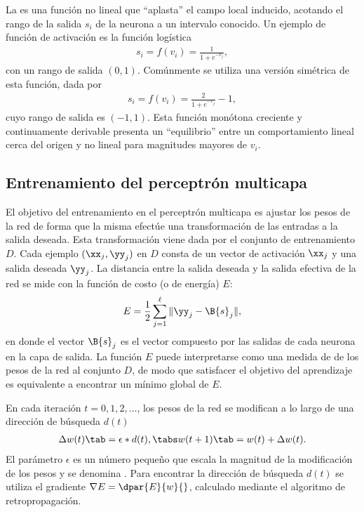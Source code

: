 La  es una función no lineal que ``aplasta''
el campo local inducido, acotando el rango de la salida $s_i$ de la
neurona a un intervalo conocido.  Un ejemplo de función de activación
es la función logística
%
\begin{align}
  s_i=f(v_i)=\frac{1}{1+e^{-v_j}},
\end{align}
%
con un rango de salida $(0,1)$. Comúnmente se utiliza una versión
simétrica de esta función, dada por
%
\begin{align}
  s_i=f(v_i) = \frac{2}{1+e^{-v_j}}-1,
\end{align}
%
cuyo rango de salida es $(-1,1)$. Esta función monótona creciente y
continuamente derivable presenta un ``equilibrio'' entre un
comportamiento lineal cerca del origen y no lineal para magnitudes
mayores de $v_i$.
%
%
\subsection{Entrenamiento del perceptrón multicapa}
%
El objetivo del entrenamiento en el perceptrón multicapa es ajustar
los pesos de la red de forma que la misma efectúe una transformación
de las entradas a la salida deseada. Esta transformación viene dada
por el conjunto de entrenamiento $D$.
Cada ejemplo $(\xx_j,\yy_j)$ en $D$ consta de un vector de activación
$\xx_j$ y una salida deseada $\yy_j$.
La distancia entre la salida deseada y la salida
efectiva de la red se mide con la función de costo (o de energía) $E$:
%
\begin{align}
  E = \frac{1}{2}\sum_{j=1}^{\ell}\|\yy_j-\B{s}_j\|,
\end{align}
%
en donde el vector $\B{s}_j$ es el vector compuesto por las salidas de
cada neurona en la capa de salida. La función $E$ puede
interpretarse como una medida de  de los pesos de la red al
conjunto $D$, de modo que satisfacer el objetivo del aprendizaje es
equivalente a encontrar un mínimo global de $E$.

En cada iteración $t=0,1,2,\ldots$, los pesos de la red
se modifican a lo largo de una dirección de búsqueda
$d(t)$ %
%
\begin{align}
  \Delta w(t)\tab=\epsilon * d(t), \tabs w(t+1) \tab= w(t)+\Delta w(t).
\end{align}
%
El parámetro $\epsilon$ es un número pequeño que escala la magnitud de
la modificación de los pesos y se denomina .  Para encontrar la dirección de búsqueda $d(t)$ se
utiliza el gradiente $\nabla{}E=\dpar{E}{w}{}$, calculado mediante el
algoritmo de retropropagación.

